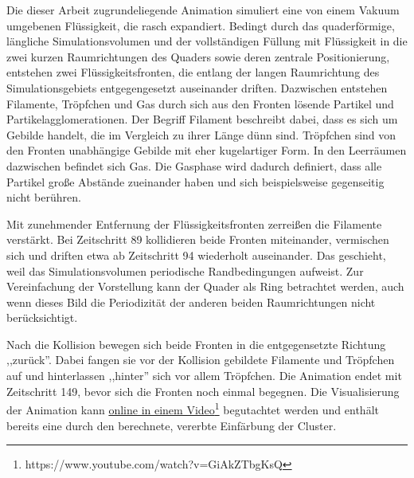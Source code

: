 Die dieser Arbeit zugrundeliegende Animation simuliert eine von einem Vakuum umgebenen Flüssigkeit, die rasch expandiert. Bedingt durch das quaderförmige, längliche Simulationsvolumen und der vollständigen Füllung mit Flüssigkeit in die zwei kurzen Raumrichtungen des Quaders sowie deren zentrale Positionierung, entstehen zwei Flüssigkeitsfronten, die entlang der langen Raumrichtung des Simulationsgebiets entgegengesetzt auseinander driften. Dazwischen entstehen Filamente, Tröpfchen und Gas durch sich aus den Fronten lösende Partikel und Partikelagglomerationen. Der Begriff Filament beschreibt dabei, dass es sich um Gebilde handelt, die im Vergleich zu ihrer Länge dünn sind. Tröpfchen sind von den Fronten unabhängige Gebilde mit eher kugelartiger Form. In den Leerräumen dazwischen befindet sich Gas. Die Gasphase wird dadurch definiert, dass alle Partikel große Abstände zueinander haben und sich beispielsweise gegenseitig nicht berühren.

Mit zunehmender Entfernung der Flüssigkeitsfronten zerreißen die Filamente verstärkt. Bei Zeitschritt 89 kollidieren beide Fronten miteinander, vermischen sich und driften etwa ab Zeitschritt 94 wiederholt auseinander. Das geschieht, weil das Simulationsvolumen periodische Randbedingungen aufweist. Zur Vereinfachung der Vorstellung kann der Quader als Ring betrachtet werden, auch wenn dieses Bild die Periodizität der anderen beiden Raumrichtungen nicht berücksichtigt.

Nach die Kollision bewegen sich beide Fronten in die entgegensetzte Richtung ,,zurück''. Dabei fangen sie vor der Kollision gebildete Filamente und Tröpfchen auf und hinterlassen ,,hinter'' sich vor allem Tröpfchen. Die Animation endet mit Zeitschritt 149, bevor sich die Fronten noch einmal begegnen. Die Visualisierung der Animation kann \href{https://www.youtube.com/watch?v=GiAkZTbgKsQ}{online in einem Video}\footnote{https://www.youtube.com/watch?v=GiAkZTbgKsQ} begutachtet werden und enthält bereits eine durch den \CFD berechnete, vererbte Einfärbung der Cluster.



